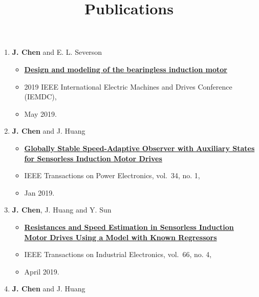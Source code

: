 \documentclass[]{article}
\title{Publications}
\date{}
\providecommand{\tightlist}{%
  \setlength{\itemsep}{0pt}\setlength{\parskip}{0pt}}
\begin{document}
\maketitle

\begin{enumerate}
\def\labelenumi{\arabic{enumi}.}
\tightlist
\item
  \textbf{J. Chen} and E. L. Severson

  \begin{itemize}
  \tightlist
  \item
    \href{https://github.com/horychen/Publications/blob/master/2019-Chen.Severson-Design.pdf}{\textbf{Design
    and modeling of the bearingless induction motor}}
  \item
    2019 IEEE International Electric Machines and Drives Conference
    (IEMDC),
  \item
    May 2019.
  \end{itemize}
\item
  \textbf{J. Chen} and J. Huang

  \begin{itemize}
  \tightlist
  \item
    \href{https://github.com/horychen/Publications/blob/master/2018-Chen.Huang-Globally\%20LyReg\%20-\%20Early\%20Access\%20Version.pdf}{\textbf{Globally
    Stable Speed-Adaptive Observer with Auxiliary States for Sensorless
    Induction Motor Drives}}
  \item
    IEEE Transactions on Power Electronics, vol.~34, no. 1,
  \item
    Jan 2019.
  \end{itemize}
\item
  \textbf{J. Chen}, J. Huang and Y. Sun

  \begin{itemize}
  \tightlist
  \item
    \href{https://github.com/horychen/Publications/blob/master/2018-Chen.Huang.ea-Resistances\%20-\%20Early\%20Access.pdf}{\textbf{Resistances
    and Speed Estimation in Sensorless Induction Motor Drives Using a
    Model with Known Regressors}}
  \item
    IEEE Transactions on Industrial Electronics, vol.~66, no. 4,
  \item
    April 2019.
  \end{itemize}
\item
  \textbf{J. Chen} and J. Huang


\end{enumerate}
\end{document}
